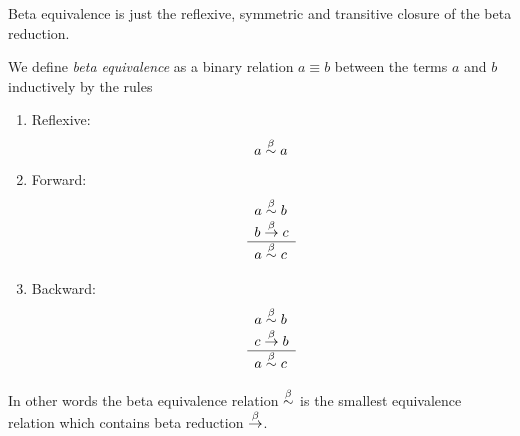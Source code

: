 Beta equivalence is just the reflexive, symmetric and transitive closure of the
beta reduction.

\begin{definition}
    We define \emph{beta equivalence} as a binary relation $a \equiv b$ between
    the terms $a$ and $b$ inductively by the rules
    \begin{enumerate}
    \item Reflexive:
        $$ a \stackrel{\beta}{\sim} a$$

    \item Forward:
        $$
        \begin{array}{l} 
            a \stackrel{\beta}{\sim} b
            \\
            b \stackrel{\beta}{\to} c
         \\ \hline 
            a \stackrel{\beta}{\sim} c
        \end{array}
        $$

    \item Backward:
        $$
        \begin{array}{l} 
            a \stackrel{\beta}{\sim} b
            \\
            c \stackrel{\beta}{\to} b
         \\ \hline 
            a \stackrel{\beta}{\sim} c
        \end{array}
        $$
    \end{enumerate}

    In other words the beta equivalence relation $\stackrel{\beta}{\sim}$ is the smallest
    equivalence relation which contains beta reduction $\stackrel{\beta}{\to}$.
\end{definition}


